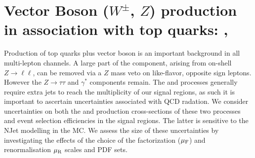 \begin{table}
{
\label{table:background_summary}
}
\end{table} 


\section{Vector Boson ($W^{\pm}$, $Z$) production in association with top quarks: \ttV, \tZ}  
\label{section:ttV}
Production of top quarks plus vector boson is an important background in all multi-lepton channels.   A large part of the \ttV component, arising from on-shell $Z\to\ell\ell$, can be removed via a $Z$ mass veto on like-flavor, opposite sign leptons.  However the $Z \to \tau\tau$ and $\gamma^*$ components remain. The \ttW and \tZ processes generally require extra jets to reach the multiplicity of our signal regions, as such it is important to ascertain uncertainties associated with QCD radation. We consider uncertainties on both the \ttW and \ttZ production cross-sections of these two processes and event selection efficiencies in the signal regions. The latter is sensitive to the NJet modelling in the MC. We assess the size of these uncertainties by investigating the effects of the choice of the factorization ($\mu_{\rm F}$) and renormalisation $\mu_{\rm R}$ scales and PDF sets. 

